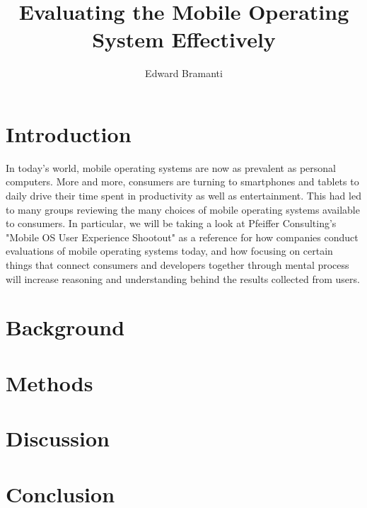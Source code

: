 \documentclass[11pt]{article}
\title{Evaluating the Mobile Operating System Effectively}
\author{Edward Bramanti}
\begin{document}
\maketitle
\begin{abstract}
\end{abstract}
\section{Introduction}
In today's world, mobile operating systems are now as prevalent as personal computers. More and more, consumers are turning to smartphones and tablets to daily drive their time spent in productivity as well as entertainment. This had led to many groups reviewing the many choices of mobile operating systems available to consumers. In particular, we will be taking a look at Pfeiffer Consulting's "Mobile OS User Experience Shootout" as a reference for how companies conduct evaluations of mobile operating systems today, and how focusing on certain things that connect consumers and developers together through mental process will increase reasoning and understanding behind the results collected from users.\cite{Thingy}
\section{Background}
\section{Methods}
\section{Discussion}
\section{Conclusion}



\end{document}
